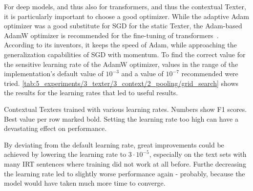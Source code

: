 For deep models, and thus also for transformers, and thus the contextual Texter, it is particularly important to choose a good optimizer. While the adaptive Adam optimizer was a good substitute for SGD for the static Texter, the Adam-based AdamW optimizer is recommended for the fine-tuning of transformers~\cite{Loshchilov2019DecoupledWD}. According to its inventors, it keeps the speed of Adam, while approaching the generalization capabilities of SGD with momentum. To find the correct value for the sensitive learning rate of the AdamW optimizer, values in the range of the implementation's default value of $10^{-3}$ and a value of $10^{-7}$ recommended were tried. \autoref{tab:5_experiments/3_texter/3_context/2_pooling/grid_search} shows the results for the learning rates that led to useful results.

\begin{table}[h]
    \centering
    
    \caption{Contextual Texters trained with various learning rates. Numbers show F1 scores. Best value per row marked bold. Setting the learning rate too high can have a devastating effect on performance.}
    \label{tab:5_experiments/3_texter/3_context/3_optimizer/grid_search}
\end{table}

By deviating from the default learning rate, great improvements could be achieved by lowering the learning rate to $3 \cdot 10^{-5}$, especially on the text sets with many IRT sentences where training did not work at all before. Furthe decreasing the learning rate led to slightly worse performance again - probably, because the model would have taken much more time to converge.
